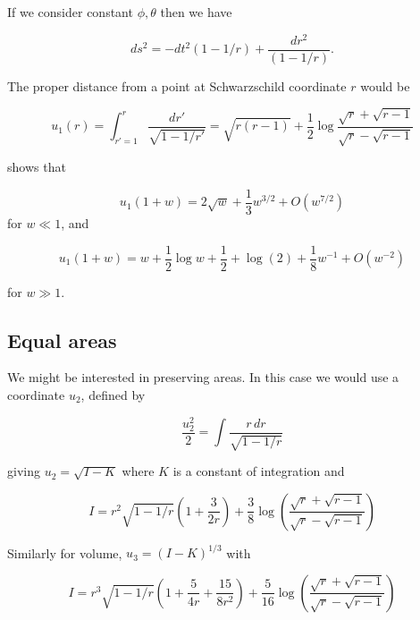 \documentclass{article}
\begin{document}
If we consider constant $\phi,\theta$ then we have 

\label{sec:headings}

\begin{equation}
  ds^2=-dt^2\left(1-1/r\right)
  +\frac{dr^2}{\left(1-1/r\right)}.
\end{equation}

The proper distance from a point at Schwarzschild coordinate $r$ would
be

\begin{equation}
  u_1(r)=
  \int_{r'=1}^r\frac{dr'}{\sqrt{1-1/r'}}=
  \sqrt{r(r-1)} + \frac{1}{2}\log\frac{\sqrt{r}+\sqrt{r-1}}{\sqrt{r}-\sqrt{r-1}}
  \end{equation}

\cite{hankin2021} shows that


\begin{equation}
  u_1(1+w)=2\sqrt{w} + \frac{1}{3}w^{3/2} + O(w^{7/2})
\end{equation}
for $w\ll 1$, and 

\begin{equation}
  u_1(1+w)=w + \frac{1}{2}\log w + \frac{1}{2} +
  \log(2) + \frac{1}{8}w^{-1} + O(w^{-2})
\end{equation}

for $w\gg 1$.

\subsection{Equal areas}

We might be interested in preserving areas.  In this case we would use
a coordinate $u_2$, defined by

\begin{equation}
  \frac{u_2^2}{2}=\int\frac{r\,dr}{\sqrt{1-1/r}}
\end{equation}

giving $u_2=\sqrt{I-K}$ where $K$ is a constant of integration and

\begin{equation}
    I = r^2\sqrt{1-{1}/{r}}\left(1+\frac{3}{2r}\right)
 + \frac{3}{8}\log\left(\frac{\sqrt{r}+\sqrt{r-1}}{\sqrt{r}-\sqrt{r-1}}\right)
\end{equation}

Similarly for volume, $u_3=(I-K)^{1/3}$ with 

\begin{equation}
    I = r^3\sqrt{1-{1}/{r}}\left(1+\frac{5}{4r} + \frac{15}{8r^2}\right)
+ \frac{5}{16}\log\left(\frac{\sqrt{r}+\sqrt{r-1}}{\sqrt{r}-\sqrt{r-1}}\right)
\end{equation}
\end{document}
